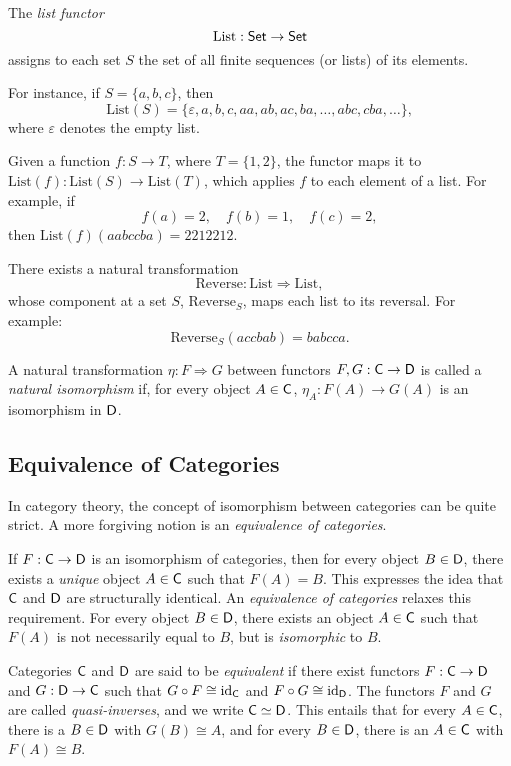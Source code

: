 \begin{example}
The \emph{list functor}
\[
\mathrm{List} : \mathsf{Set} \to \mathsf{Set}
\]
assigns to each set \( S \) the set of all finite sequences (or lists) of its elements. 

For instance, if \( S = \{a, b, c\} \), then
\[
\mathrm{List}(S) = \{\varepsilon, a, b, c, aa, ab, ac, ba, \ldots, abc, cba, \ldots\},
\]
where \( \varepsilon \) denotes the empty list.

Given a function \( f : S \to T \), where $T=\{1,2\} $, the functor maps it to \(\mathrm{List}(f) : \mathrm{List}(S) \to \mathrm{List}(T)\), which applies \( f \) to each element of a list. For example, if
\[
f(a) = 2, \quad f(b) = 1, \quad f(c) = 2,
\]
then \(\mathrm{List}(f)(aabccba) = 2212212\).

There exists a natural transformation
\[
\mathrm{Reverse} : \mathrm{List} \Rightarrow \mathrm{List},
\]
whose component at a set \(S\), \(\mathrm{Reverse}_S\), maps each list to its reversal. For example:
\[
\mathrm{Reverse}_S(accbab) = babcca.
\]

\end{example}


\begin{definition}
  A natural transformation $\eta : F \Rightarrow G$ between functors $F, G : \mathsf{C} \to \mathsf{D}$ is called a \emph{natural isomorphism} if, for every object $A \in \mathsf{C}$,  $\eta_A : F(A) \to G(A)$ is an isomorphism in $\mathsf{D}$.
\end{definition}


\subsection{Equivalence of Categories}

In category theory, the concept of isomorphism between categories can be quite strict.
A more forgiving notion is an \emph{equivalence of categories}.

If \( F: \mathsf{C} \to \mathsf{D} \) is an isomorphism of categories, then for every object \( B \in \mathsf{D} \), there exists a \emph{unique} object \( A \in \mathsf{C} \) such that \( F(A) = B \). This expresses the idea that \( \mathsf{C} \) and \( \mathsf{D} \) are structurally identical.
An \emph{equivalence of categories} relaxes this requirement. For every object \( B \in \mathsf{D} \), there exists an object \( A \in \mathsf{C} \) such that \( F(A) \) is not necessarily equal to \( B \), but is \emph{isomorphic} to \( B \). 

\begin{definition}
  Categories \( \mathsf{C} \) and \( \mathsf{D} \) are  said to be \emph{equivalent} if there exist functors 
\( F: \mathsf{C} \to \mathsf{D} \) and \( G: \mathsf{D}\to \mathsf{C} \) such that 
\( G \circ F \cong \mathrm{id}_{\mathsf{C}} \) and \( F \circ G \cong \mathrm{id}_{\mathsf{D}} \). 
The functors \( F \) and \( G \) are called \emph{quasi-inverses}, and we write \( \mathsf{C} \simeq \mathsf{D} \).
This entails that for every \( A \in \mathsf{C} \), there is a \( B \in \mathsf{D} \) with \( G(B) \cong A \), 
and for every \( B \in \mathsf{D} \), there is an \( A \in \mathsf{C} \) with \( F(A) \cong B \).
\end{definition}

